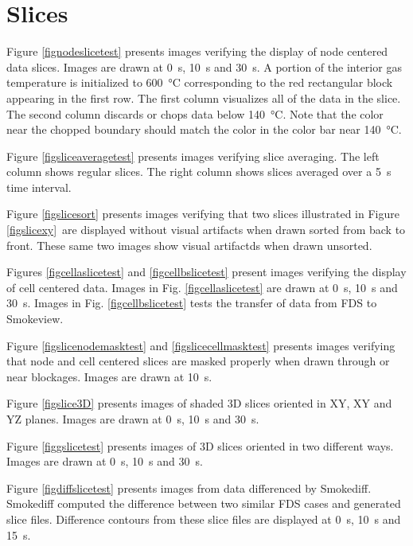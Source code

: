 \documentclass[11pt,twoside]{book}
\begin{document}
\clearpage

\section{Slices}
Figure \ref{fignodeslicetest} presents images verifying the display of node centered data slices.
Images are drawn at \SI{0}{s}, \SI{10}{s} and \SI{30}{s}. A portion of the interior
gas temperature is initialized to \SI{600}{\degreeCelsius} corresponding to the
red rectangular block appearing in the first row. The first column visualizes
all of the data in the slice.  The second column discards or chops data below
\SI{140}{\degreeCelsius}. Note that the color near the chopped boundary should
match the color in the color bar near \SI{140}{\degreeCelsius}.

Figure \ref{figsliceaveragetest} presents images verifying slice averaging.  The left column shows regular slices.  The right column
shows slices averaged over a 5~s time interval.

Figure \ref{figslicesort} presents images verifying that two slices
illustrated in Figure \ref{figslicexy}\
are displayed without visual artifacts when drawn sorted from back to front.
These same two images show visual artifactds when drawn unsorted.

Figures \ref{figcellaslicetest} and \ref{figcellbslicetest} present images
verifying the display of cell centered data. Images in Fig. \ref{figcellaslicetest}
are drawn at \SI{0}{s}, \SI{10}{s} and \SI{30}{s}. Images in
Fig. \ref{figcellbslicetest} tests the transfer of data from FDS to Smokeview.

Figure \ref{figslicenodemasktest} and \ref{figslicecellmasktest} presents images verifying that node and cell centered slices
are masked properly when drawn through or near blockages. Images are drawn at \SI{10}{s}.

Figure \ref{figslice3D} presents images of shaded 3D slices oriented in XY, XY and YZ planes.
Images are drawn at \SI{0}{s}, \SI{10}{s} and \SI{30}{s}.

Figure \ref{figgslicetest} presents images of 3D slices oriented in two different
ways. Images are drawn at \SI{0}{s}, \SI{10}{s} and \SI{30}{s}.

Figure \ref{figdiffslicetest} presents images from data differenced by Smokediff.
Smokediff computed the difference between two similar FDS cases and generated slice
files. Difference contours from these slice files are displayed at \SI{0}{s},
\SI{10}{s} and \SI{15}{s}.
\end{document}
